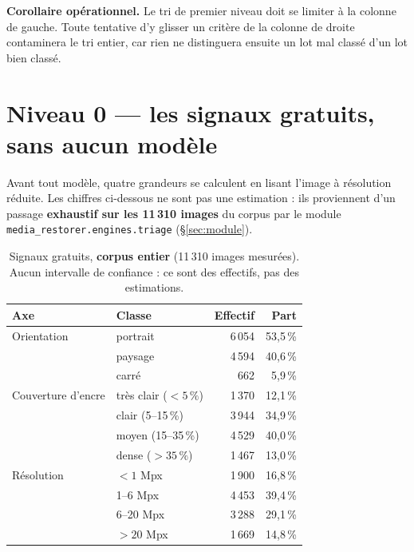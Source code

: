 \documentclass[11pt,a4paper]{article}
\newcommand{\aretenir}[1]{%
  \par\medskip
  \noindent\colorbox{encadre}{%
    \begin{minipage}{\dimexpr\linewidth-2\fboxsep}
      \vspace{2pt}#1\vspace{2pt}
    \end{minipage}}%
  \par\medskip
}
\newcommand{\modtriage}{\texttt{media\_restorer.\allowbreak engines.\allowbreak triage}}
\begin{document}
\aretenir{\textbf{Corollaire opérationnel.} Le tri de premier niveau doit se
limiter à la colonne de gauche. Toute tentative d'y glisser un critère de la
colonne de droite contaminera le tri entier, car rien ne distinguera ensuite un
lot mal classé d'un lot bien classé.}

\section{Niveau 0 — les signaux gratuits, sans aucun modèle}
\label{sec:niveau0}

Avant tout modèle, quatre grandeurs se calculent en lisant l'image à résolution
réduite. Les chiffres ci-dessous ne sont pas une estimation : ils proviennent
d'un passage \textbf{exhaustif sur les 11\,310 images} du corpus par le module
\modtriage{} (§\ref{sec:module}).

\begin{table}[h]
\centering\small
\begin{tabular}{llrr}
\toprule
\textbf{Axe} & \textbf{Classe} & \textbf{Effectif} & \textbf{Part} \\
\midrule
Orientation & portrait      & 6\,054 & 53,5\,\% \\
            & paysage       & 4\,594 & 40,6\,\% \\
            & carré         & \phantom{0}\phantom{0}662 & \phantom{0}5,9\,\% \\
\midrule
Couverture d'encre & très clair ($<5\,\%$) & 1\,370 & 12,1\,\% \\
                   & clair (5--15\,\%)     & 3\,944 & 34,9\,\% \\
                   & moyen (15--35\,\%)    & 4\,529 & 40,0\,\% \\
                   & dense ($>35\,\%$)     & 1\,467 & 13,0\,\% \\
\midrule
Résolution & $<1$ Mpx      & 1\,900 & 16,8\,\% \\
           & 1--6 Mpx      & 4\,453 & 39,4\,\% \\
           & 6--20 Mpx     & 3\,288 & 29,1\,\% \\
           & $>20$ Mpx     & 1\,669 & 14,8\,\% \\
\bottomrule
\end{tabular}
\caption{Signaux gratuits, \textbf{corpus entier} (11\,310 images mesurées).
Aucun intervalle de confiance : ce sont des effectifs, pas des estimations.}
\end{table}
\end{document}
